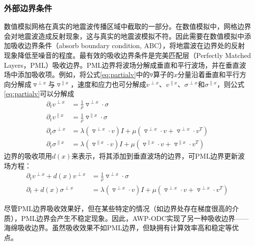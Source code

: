 \subsubsection{外部边界条件} %
\label{ssub:外部边界条件}
数值模拟网格在真实的地震波传播区域中截取的一部分。在数值模拟中，网格边界会对地震波造成反射现象，这与真实的地震波模拟不符。因此需要在数值模拟中添加吸收边界条件（absorb boundary condition, ABC），将地震波在边界处的反射现象降低至噪音的程度。最有效的吸收边界条件是完美匹配层（Perfectly Matched Layers，PML）吸收边界\cite{berenger1994perfectly,berenger1996three}。PML边界将波场分解成垂直和平行波场，并在垂直波场中添加吸收项。例如，将公式\ref{eq:partialv}中的$\triangledown$算子的$x$分量沿着垂直和平行方向分解成$\triangledown^{\perp x}$与$\triangledown^{\parallel x}$，速度和应力也可分解成$v^{\perp x}$、$v^{\parallel x}$、$\sigma^{\perp x}$和$\sigma^{\parallel x}$，则公式\ref{eq:partialv}可以分解成
\begin{equation}
  \begin{aligned}
    \partial _t v^{\perp x} &= \frac{1}{\rho}\triangledown ^{\perp x} \cdot \sigma  \\
    \partial _t v^{\parallel x} &= \frac{1}{\rho}\triangledown ^{\parallel x} \cdot \sigma  \\
\partial _{t}\sigma^{\perp x} &= \lambda(\triangledown ^{\perp x}\cdot v)I + \mu(\triangledown ^{\perp x} \cdot v + \triangledown ^{\perp x}\cdot v^T) \\
\partial _{t}\sigma^{\parallel x} &= \lambda(\triangledown ^{\parallel x}\cdot v)I + \mu(\triangledown ^{\parallel x} \cdot v + \triangledown ^{\parallel x}\cdot v^T)
  \end{aligned}
\end{equation}
边界的吸收项用$d(x)$来表示，将其添加到垂直波场的边界，可PML边界更新波场方程：
\begin{equation}
  \begin{aligned}
    \partial _t v^{\perp x} +d(x)v^{\perp x} &= \frac{1}{\rho}\triangledown ^{\perp x} \cdot \sigma  \\
    \partial _{t} + d(x)\sigma^{\perp x} &= \lambda(\triangledown ^{\perp x}\cdot v)I + \mu(\triangledown ^{\perp x} \cdot v + \triangledown ^{\perp x}\cdot v^T)
  \end{aligned}
\end{equation}

尽管PML边界吸收效果好，但在某些特定的情况（如边界处存在梯度很高的介质），PML边界会产生不稳定现象\cite{marcinkovich2002implementation}。因此，AWP-ODC实现了另一种吸收边界——海绵吸收边界\cite{cerjan1985nonreflecting}。虽然吸收效果不如PML边界，但缺拥有计算效率高和稳定等优点。

